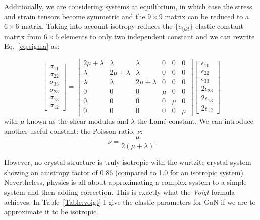 Additionally, we are considering systems at equilibrium, in which case the stress and strain tensors become symmetric and the $9 \times 9$ matrix can be reduced to a $6 \times 6$ matrix. Taking into account isotropy reduces the $\{c_{ijkl}\}$ elastic constant matrix from $6\times6$ elements to only two independent constant and we can rewrite Eq.~\ref{eq:sigma} as:

\begin{equation}
\begin{bmatrix}
\sigma_{11}\\
\sigma_{22}\\
\sigma_{33}\\
\sigma_{23}\\
\sigma_{13}\\
\sigma_{12}
\end{bmatrix}
=
\begin{bmatrix}
2\mu+\lambda  &  \lambda       &  \lambda       &  0 & 0 & 0\\
\lambda       &  2\mu+\lambda  &  \lambda       &  0 & 0 & 0\\
\lambda       &       \lambda  &  2\mu+\lambda  &  0 & 0 & 0\\
 0            &       0        &  0             &\mu & 0 & 0\\
 0            &       0        &  0             &0   &\mu& 0\\
 0            &       0        &  0             &0   & 0 & \mu
\end{bmatrix}
%
\begin{bmatrix}
\epsilon_{11}\\
\epsilon_{22}\\
\epsilon_{33}\\
2\epsilon_{23}\\
2\epsilon_{13}\\
2\epsilon_{12}
\end{bmatrix}
\end{equation}
with $\mu$ known as the shear modulus and $\lambda$ the Lam\'{e} constant. We can introduce another useful constant: the Poisson ratio, $\nu$:
\begin{equation*}
 \nu = \frac{\mu}{2(\mu + \lambda )}   
\end{equation*}


However, no crystal structure is truly isotropic with the wurtzite crystal system showing an anistropy factor of 0.86 (compared to 1.0 for an isotropic system). Nevertheless, physics is all about approximating a complex system to a simple system and then adding correction. This is exactly what the \textit{ Voigt} formula~\cite{Hirthbook} achieves. In Table~\ref{Table:voigt} I give the elastic parameters for GaN if we are to approximate it to be isotropic. 

